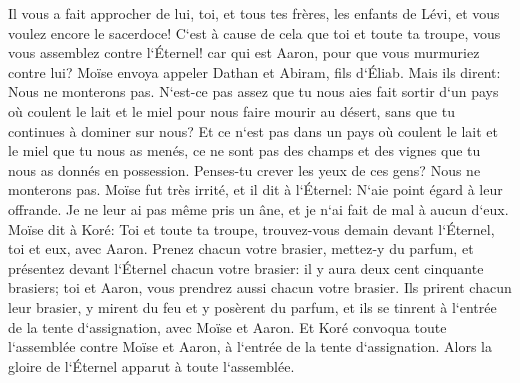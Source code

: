 \verse Il vous a fait approcher de lui, toi, et tous tes frères, les enfants de Lévi, et vous voulez encore le sacerdoce! 
\verse C`est à cause de cela que toi et toute ta troupe, vous vous assemblez contre l`Éternel! car qui est Aaron, pour que vous murmuriez contre lui? 
\verse Moïse envoya appeler Dathan et Abiram, fils d`Éliab. Mais ils dirent: Nous ne monterons pas. 
\verse N`est-ce pas assez que tu nous aies fait sortir d`un pays où coulent le lait et le miel pour nous faire mourir au désert, sans que tu continues à dominer sur nous? 
\verse Et ce n`est pas dans un pays où coulent le lait et le miel que tu nous as menés, ce ne sont pas des champs et des vignes que tu nous as donnés en possession. Penses-tu crever les yeux de ces gens? Nous ne monterons pas. 
\verse Moïse fut très irrité, et il dit à l`Éternel: N`aie point égard à leur offrande. Je ne leur ai pas même pris un âne, et je n`ai fait de mal à aucun d`eux. 
\verse Moïse dit à Koré: Toi et toute ta troupe, trouvez-vous demain devant l`Éternel, toi et eux, avec Aaron. 
\verse Prenez chacun votre brasier, mettez-y du parfum, et présentez devant l`Éternel chacun votre brasier: il y aura deux cent cinquante brasiers; toi et Aaron, vous prendrez aussi chacun votre brasier. 
\verse Ils prirent chacun leur brasier, y mirent du feu et y posèrent du parfum, et ils se tinrent à l`entrée de la tente d`assignation, avec Moïse et Aaron. 
\verse Et Koré convoqua toute l`assemblée contre Moïse et Aaron, à l`entrée de la tente d`assignation. Alors la gloire de l`Éternel apparut à toute l`assemblée. 
